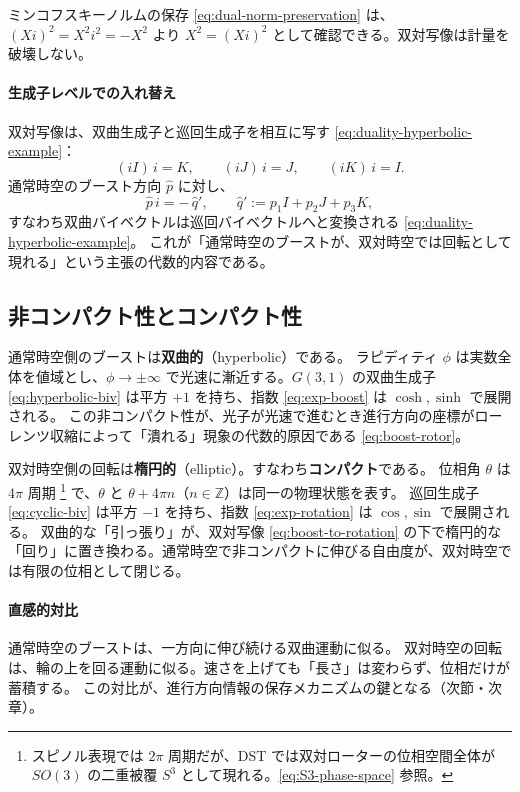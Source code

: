 \documentclass[dvipdfmx,a4paper,oneside]{jsbook}
\numberwithin{equation}{chapter}
\begin{document}
ミンコフスキーノルムの保存 \eqref{eq:dual-norm-preservation} は、\((Xi)^2 = X^2 i^2 = -X^2\) より \(X^2 = (Xi)^2\) として確認できる。双対写像は計量を破壊しない。

\paragraph{生成子レベルでの入れ替え}
双対写像は、双曲生成子と巡回生成子を相互に写す \eqref{eq:duality-hyperbolic-example}：
\begin{equation}
  (iI)\, i = K, \qquad (iJ)\, i = J, \qquad (iK)\, i = I.
  \label{eq:duality-generator-swap}
\end{equation}
通常時空のブースト方向 \(\hat{p}\) に対し、
\begin{equation}
  \hat{p}\, i = -\,\hat{q}',
  \qquad
  \hat{q}' := p_1 I + p_2 J + p_3 K,
  \label{eq:boost-to-rotation}
\end{equation}
すなわち双曲バイベクトルは巡回バイベクトルへと変換される \eqref{eq:duality-hyperbolic-example}。
これが「通常時空のブーストが、双対時空では回転として現れる」という主張の代数的内容である。

\subsection{非コンパクト性とコンパクト性}

通常時空側のブーストは\textbf{双曲的}（hyperbolic）である。
ラピディティ \(\phi\) は実数全体を値域とし、\(\phi \to \pm\infty\) で光速に漸近する。\(G(3,1)\) の双曲生成子 \eqref{eq:hyperbolic-biv} は平方 \(+1\) を持ち、指数 \eqref{eq:exp-boost} は \(\cosh,\sinh\) で展開される。
この非コンパクト性が、光子が光速で進むとき進行方向の座標がローレンツ収縮によって「潰れる」現象の代数的原因である \eqref{eq:boost-rotor}。

双対時空側の回転は\textbf{楕円的}（elliptic）。すなわち\textbf{コンパクト}である。
位相角 \(\theta\) は \(4\pi\) 周期 \footnote{スピノル表現では \(2\pi\) 周期だが、DST では双対ローターの位相空間全体が \(SO(3)\) の二重被覆 \(S^3\) として現れる。\eqref{eq:S3-phase-space} 参照。} で、\(\theta\) と \(\theta + 4\pi n\)（\(n \in \mathbb{Z}\)）は同一の物理状態を表す。
巡回生成子 \eqref{eq:cyclic-biv} は平方 \(-1\) を持ち、指数 \eqref{eq:exp-rotation} は \(\cos,\sin\) で展開される。
双曲的な「引っ張り」が、双対写像 \eqref{eq:boost-to-rotation} の下で楕円的な「回り」に置き換わる。通常時空で非コンパクトに伸びる自由度が、双対時空では有限の位相として閉じる。

\paragraph{直感的対比}
通常時空のブーストは、一方向に伸び続ける双曲運動に似る。
双対時空の回転は、輪の上を回る運動に似る。速さを上げても「長さ」は変わらず、位相だけが蓄積する。
この対比が、進行方向情報の保存メカニズムの鍵となる（次節・次章）。
\end{document}

